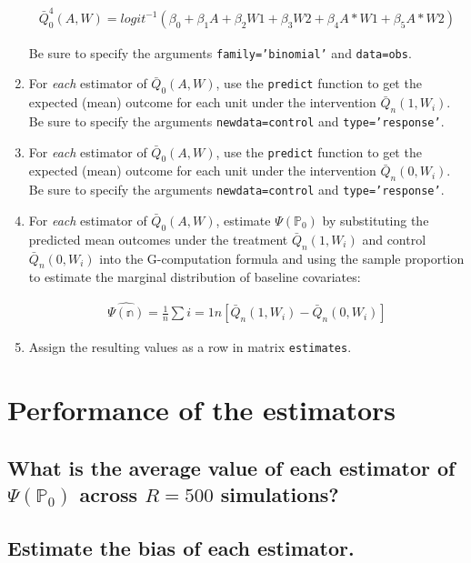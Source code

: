 \documentclass{article}\usepackage[]{graphicx}\usepackage[]{xcolor}
\begin{document}
\begin{enumerate}[label=\textbf{\alph*.}]
\begin{align*}
\bar{Q}^4_0(A,W)=logit^{-1}(\beta_0+\beta_1A+\beta_2W1+\beta_3W2+\beta_4A*W1+\beta_5A*W2)
\end{align*}

Be sure to specify the arguments \texttt{family='binomial'} and \texttt{data=obs}.
    
    \item For \textit{each} estimator of $\bar{Q}_0(A,W)$, use the \texttt{predict} function to get the expected (mean) outcome for each unit under the intervention $\bar{Q}_n(1,W_i)$. Be sure to specify the arguments \texttt{newdata=control} and \texttt{type='response'}.
    
    \item For \textit{each} estimator of $\bar{Q}_0(A,W)$, use the \texttt{predict} function to get the expected (mean) outcome for each unit under the intervention $\bar{Q}_n(0,W_i)$. Be sure to specify the arguments \texttt{newdata=control} and \texttt{type='response'}.
    
    \item For \textit{each} estimator of $\bar{Q}_0(A,W)$, estimate $\Psi(\mathbb{P}_0)$ by substituting the predicted mean outcomes under the treatment $\bar{Q}_n(1,W_i)$ and control $\bar{Q}_n(0,W_i)$ into the G-computation formula and using the sample proportion to estimate the marginal distribution of baseline covariates:
    
\begin{align*}
\hat{\Psi(\mathbb{n})}=\frac{1}{n}\sum{i=1}{n}[\bar{Q}_n(1,W_i)-\bar{Q}_n(0,W_i)]
\end{align*}
    
    \item Assign the resulting values as a row in matrix \texttt{estimates}.
    
  \end{enumerate}
    
\section{Performance of the estimators}

  \subsection{What is the average value of each estimator of $\Psi(\mathbb{P}_0)$ across $R=500$ simulations?}
  
  \subsection{Estimate the bias of each estimator.}
  
\end{document}
